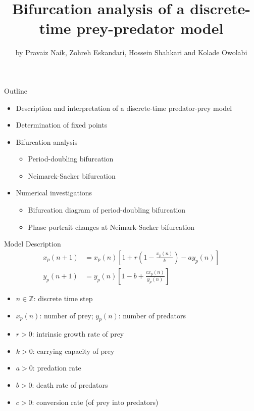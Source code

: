 \documentclass[]{beamer}
\title{Bifurcation analysis of a discrete-time prey-predator model}
\author{by Pravaiz Naik, Zohreh Eskandari, Hossein Shahkari and Kolade Owolabi}
\institute{Presented by Jacob Hauck}
\date{}
\begin{document}
	\frame{\titlepage}
	
	\begin{frame}{Outline}
		\begin{itemize}
			\item Description and interpretation of a discrete-time predator-prey model
			\vfill
			
			\item Determination of fixed points
			\vfill
			
			\item Bifurcation analysis
			\begin{itemize}
				\item Period-doubling bifurcation
				\item Neimarck-Sacker bifurcation
			\end{itemize}
			\vfill
			
			\item Numerical investigations
			\begin{itemize}
				\item Bifurcation diagram of period-doubling bifurcation
				\item Phase portrait changes at Neimark-Sacker bifurcation
			\end{itemize}
		\end{itemize}
	\end{frame}
	
	\begin{frame}{Model Description}
		\begin{align*}
			x_p(n+1) &= x_p(n)\left[1 + r\left(1 - \frac{x_p(n)}{k}\right) - ay_p(n)\right] \\[0.3em]
			y_p(n+1) &= y_p(n)\left[1 - b + \frac{cx_p(n)}{y_p(n)}\right]
		\end{align*}
		\begin{itemize}
			\item $n \in \mathbb{Z}$: discrete time step
			\item $x_p(n)$: number of prey; $y_p(n)$: number of predators
			\item $r > 0$: intrinsic growth rate of prey
			\item $k > 0$: carrying capacity of prey
			\item $a > 0$: predation rate
			\item $b > 0$: death rate of predators
			\item $c > 0$: conversion rate (of prey into predators)
		\end{itemize}
	\end{frame}
	
\end{document}
